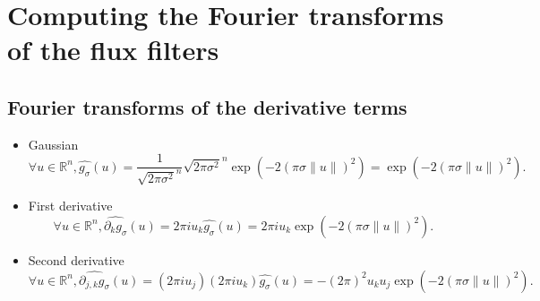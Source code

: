 \documentclass[11pt]{amsart}
\begin{document}
\section{Computing the Fourier transforms of the flux filters}
\subsection{Fourier transforms of the derivative terms}
\begin{itemize}
\item Gaussian
\begin{equation}\label{eq:FourierTransforGaussian}
\forall u\in\mathbb{R}^n,  \widehat{g_\sigma}(u) = \frac{1}{\sqrt{2\pi\sigma^2}^n} \sqrt{2\pi\sigma^2}^n  \exp(-2 (\pi \sigma \|u\|)^2) = \exp(-2 (\pi \sigma \|u\|)^2).
\end{equation}
\item First derivative
\begin{equation}\label{eq:FirstDerivative}
\forall u\in\mathbb{R}^n,  \widehat{\partial_k g_\sigma}(u) = 2\pi i u_k \widehat{g_\sigma}(u) = 2\pi i u_k \exp(-2 (\pi \sigma \|u\|)^2).
\end{equation}
\item Second derivative
\begin{equation}\label{eq:SecondDerivative}
\forall u\in\mathbb{R}^n,  \widehat{\partial_{j,k} g_\sigma}(u) = (2\pi i u_j) (2\pi i u_k) \widehat{g_\sigma}(u) = -(2\pi)^2  u_k u_j \exp(-2 (\pi \sigma \|u\|)^2).
\end{equation}
\end{itemize}
\end{document}

